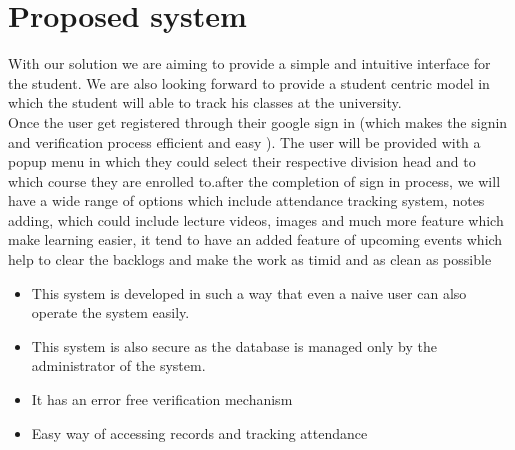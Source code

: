 \section{Proposed system}

With our solution we are aiming to provide a simple and intuitive interface for the student. We are also looking forward to provide a student centric model in which the student will able to track his classes at the university.\\

Once the user get registered through their google sign in (which makes the signin and verification process efficient and easy ). The user will be provided with a popup menu in which they could select their respective division head and to which course they are enrolled to.after the completion of sign in process, we will have a wide range of options which include attendance tracking system, notes adding, which could include lecture videos, images and much more feature which make learning easier, it tend to have an added feature of upcoming events which help to clear the backlogs and make the work as timid and as clean as possible\\

\begin{itemize}
\item This system is developed in such a way that even a naive user can also operate the system easily.
\item This system is also secure as the database is managed only by
the administrator of the system.
\item It has an error free verification mechanism
\item Easy way of accessing records and tracking attendance
\end{itemize}

